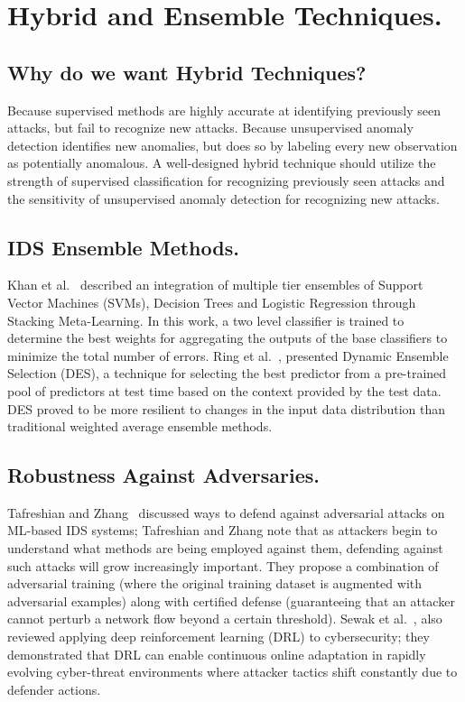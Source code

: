 \section{Hybrid and Ensemble Techniques. }


\subsection{Why do we want Hybrid Techniques? }

Because supervised methods are highly accurate at identifying previously seen attacks, but fail to recognize new attacks. Because unsupervised anomaly detection identifies new anomalies, but does so by labeling every new observation as potentially anomalous. A well-designed hybrid technique should utilize the strength of supervised classification for recognizing previously seen attacks and the sensitivity of unsupervised anomaly detection for recognizing new attacks.

\subsection{IDS Ensemble Methods. }

Khan et al.~\cite{khan2021invehicle} described an integration of multiple tier ensembles of Support Vector Machines (SVMs), Decision Trees and Logistic Regression through Stacking Meta-Learning. In this work, a two level classifier is trained to determine the best weights for aggregating the outputs of the base classifiers to minimize the total number of errors. Ring et al.~\cite{ring2019survey}, presented Dynamic Ensemble Selection (DES), a technique for selecting the best predictor from a pre-trained pool of predictors at test time based on the context provided by the test data. DES proved to be more resilient to changes in the input data distribution than traditional weighted average ensemble methods.

\subsection{Robustness Against Adversaries. }

Tafreshian and Zhang~\cite{tafreshian2025adv} discussed ways to defend against adversarial attacks on ML-based IDS systems; Tafreshian and Zhang note that as attackers begin to understand what methods are being employed against them, defending against such attacks will grow increasingly important. They propose a combination of adversarial training (where the original training dataset is augmented with adversarial examples) along with certified defense (guaranteeing that an attacker cannot perturb a network flow beyond a certain threshold). Sewak et al.~\cite{sewak2022drl}, also reviewed applying deep reinforcement learning (DRL) to cybersecurity; they demonstrated that DRL can enable continuous online adaptation in rapidly evolving cyber-threat environments where attacker tactics shift constantly due to defender actions.

